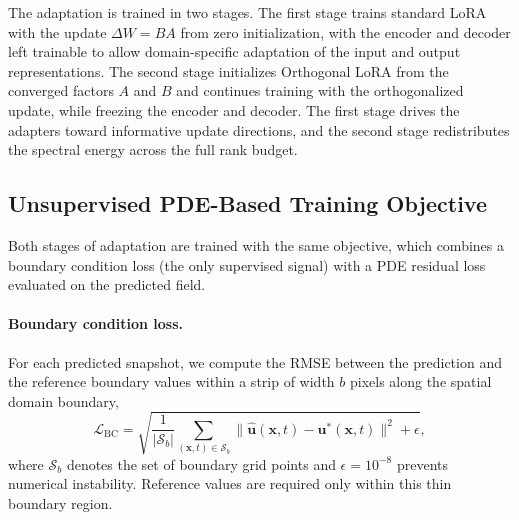 \documentclass{article}
\begin{document}
The adaptation is trained in two stages. The first stage trains standard LoRA with the update $\Delta W = BA$ from zero initialization, with the encoder and decoder left trainable to allow domain-specific adaptation of the input and output representations. The second stage initializes Orthogonal LoRA from the converged factors $A$ and $B$ and continues training with the orthogonalized update, while freezing the encoder and decoder. The first stage drives the adapters toward informative update directions, and the second stage redistributes the spectral energy across the full rank budget.

\subsection{Unsupervised PDE-Based Training Objective}
\label{sec:physlora}

Both stages of adaptation are trained with the same objective, which combines a boundary condition loss (the only supervised signal) with a PDE residual loss evaluated on the predicted field.

\paragraph{Boundary condition loss.}
For each predicted snapshot, we compute the RMSE between the prediction and the reference boundary values within a strip of width $b$ pixels along the spatial domain boundary,
\begin{equation}
\mathcal{L}_{\mathrm{BC}} = \sqrt{\frac{1}{|\mathcal{S}_b|} \sum_{(\mathbf{x},t) \in \mathcal{S}_b} \|\hat{\mathbf{u}}(\mathbf{x},t) - \mathbf{u}^*(\mathbf{x},t)\|^2 + \epsilon},
\end{equation}
where $\mathcal{S}_b$ denotes the set of boundary grid points and $\epsilon = 10^{-8}$ prevents numerical instability. Reference values are required only within this thin boundary region.
\end{document}
